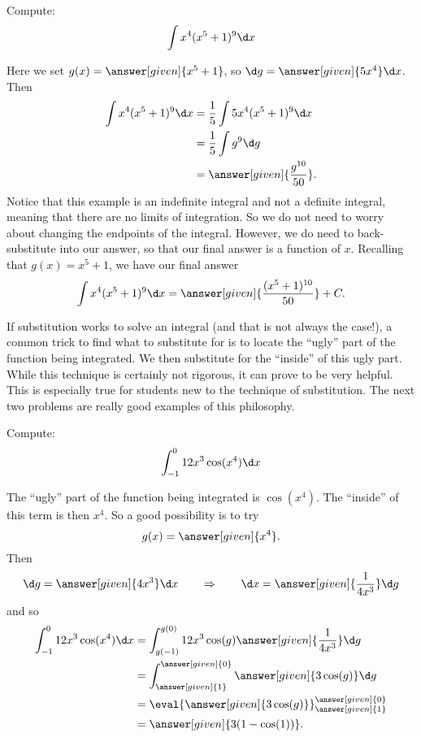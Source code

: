 \documentclass{ximera}
\begin{document}
\begin{example}
Compute:
\[
\int x^4(x^5+1)^{9} \d x
\]
\begin{explanation}
Here we set $g(x) =  \answer[given]{x^5+1}$, so $\d g =  \answer[given]{5x^4} \d x$.  Then
\begin{align*}
  \int x^4(x^5+1)^{9} \d x &= \frac{1}{5} \int 5x^4 (x^5+1)^{9} \d x \\
  &= \frac{1}{5} \int g^{9} \d g\\
&= \answer[given]{\frac{g^{10}}{50}}.
\end{align*}
Notice that this example is an indefinite integral and not a definite
integral, meaning that there are no limits of integration.  So we do
not need to worry about changing the endpoints of the integral.  However,
we do need to back-substitute into our answer, so that our final
answer is a function of $x$.  Recalling that $g(x) = x^5+1$, we have
our final answer
\[
\int x^4(x^5+1)^{9} \d x= \answer[given]{\frac{(x^5+1)^{10}}{50}}+C.
\]
\end{explanation}
\end{example}


If substitution works to solve an integral (and that is not always the
case!), a common trick to find what to substitute for is to locate the
``ugly'' part of the function being integrated.  We then substitute
for the ``inside'' of this ugly part.  While this technique is
certainly not rigorous, it can prove to be very helpful.  This is
especially true for students new to the technique of substitution.
The next two problems are really good examples of this philosophy.

\begin{example}
Compute:
\[
\int_{-1}^0 12x^3 \cos(x^4) \d x
\]
\begin{explanation}
The ``ugly'' part of the function being integrated is $\cos(x^4)$.  The
``inside'' of this term is then $x^4$.  So a good possibility is to
try
\[
g(x) =  \answer[given]{x^4}.
\]
Then
\[
\d g =  \answer[given]{4x^3} \d x 	\qquad	\Rightarrow	\qquad	\d x = \answer[given]{\frac{1}{4x^3}} \d g
\]
and so
\begin{align*}
\int_{-1}^0 12x^3 \cos(x^4) \d x &= \int_{g(-1)}^{g(0)} 12 x^3\cos(g) \answer[given]{\frac{1}{4x^3}} \d g  \\
&= \int_{\answer[given]{1}}^{\answer[given]{0}} \answer[given]{3 \cos(g)} \d g  \\
&= \eval{\answer[given]{3\cos(g)}}_{\answer[given]{1}}^{\answer[given]{0}}  \\
&= \answer[given]{3(1-\cos(1))}.
\end{align*}
\end{explanation}
\end{example}
\end{document}
